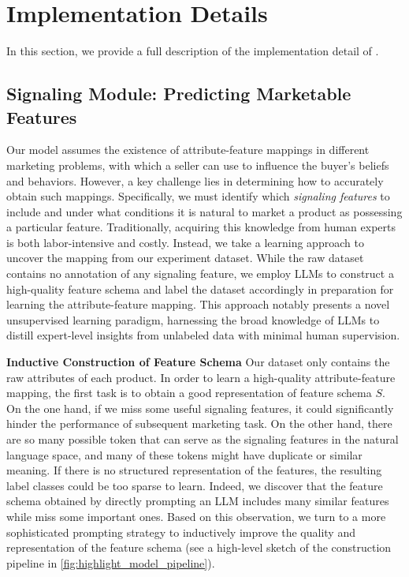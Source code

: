 \section{Implementation Details}
\label{app: implementation-details}
In this section, we provide a full description of the implementation detail of \agentname.

\subsection{Signaling Module: Predicting Marketable Features}
\label{sec: highlight_model-app}
Our model assumes the existence of attribute-feature mappings in different marketing problems, with which a seller can use to influence the buyer's beliefs and behaviors. However, a key challenge lies in determining how to accurately obtain such mappings. Specifically, we must identify which \emph{signaling features} to include and under what conditions it is natural to market a product as possessing a particular feature. Traditionally, acquiring this knowledge from human experts is both labor-intensive and costly. 
Instead, we take a learning approach to uncover the mapping from our experiment dataset. 
While the raw dataset contains no annotation of any signaling feature, we employ LLMs to construct a high-quality feature schema and label the dataset accordingly in preparation for learning the attribute-feature mapping. 
This approach notably presents a novel unsupervised learning paradigm, harnessing the broad knowledge of LLMs to distill expert-level insights from unlabeled data with minimal human supervision.

\textbf{Inductive Construction of Feature Schema} 
Our dataset only contains the raw attributes of each product. In order to learn a high-quality attribute-feature mapping, the first task is to obtain a good representation of feature schema $S$. 
On the one hand, if we miss some useful signaling features, it could significantly hinder the performance of subsequent marketing task. On the other hand, there are so many possible token that can serve as the signaling features in the natural language space, and many of these tokens might have duplicate or similar meaning. If there is no structured representation of the features, the resulting label classes could be too sparse to learn.
Indeed, we discover that the feature schema obtained by directly prompting an LLM includes many similar features while miss some important ones.
Based on this observation, we turn to a more sophisticated prompting strategy to inductively improve the quality and representation of the feature schema (see a high-level sketch of the construction pipeline in \cref{fig:highlight_model_pipeline}).

